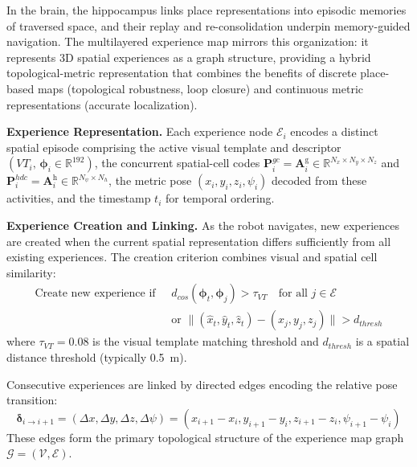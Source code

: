 In the brain, the hippocampus links place representations into episodic memories of traversed space, and their replay and re-consolidation underpin memory-guided navigation. The multilayered experience map mirrors this organization: it represents 3D spatial experiences as a graph structure, providing a hybrid topological-metric representation that combines the benefits of discrete place-based maps (topological robustness, loop closure) and continuous metric representations (accurate localization).

\textbf{Experience Representation.} Each experience node $\mathcal{E}_i$ encodes a distinct spatial episode comprising the active visual template and descriptor $(VT_i,\,\boldsymbol{\phi}_i\in\mathbb{R}^{192})$, the concurrent spatial-cell codes $\mathbf{P}^{gc}_i=\mathbf{A}^\mathrm{g}_i\in\mathbb{R}^{N_x\times N_y\times N_z}$ and $\mathbf{P}^{hdc}_i=\mathbf{A}^\mathrm{h}_i\in\mathbb{R}^{N_\psi\times N_h}$, the metric pose $(x_i, y_i, z_i, \psi_i)$ decoded from these activities, and the timestamp $t_i$ for temporal ordering.

\textbf{Experience Creation and Linking.} As the robot navigates, new experiences are created when the current spatial representation differs sufficiently from all existing experiences. The creation criterion combines visual and spatial cell similarity:
\begin{equation}
    \begin{aligned}
        \text{Create new experience if }\; & d_{cos}(\boldsymbol{\phi}_t, \boldsymbol{\phi}_j) > \tau_{VT} \quad \text{for all } j \in \mathcal{E} \\
                                           & \text{or } \lVert (\hat{x}_t, \hat{y}_t, \hat{z}_t) - (x_j, y_j, z_j) \rVert > d_{thresh}
    \end{aligned}
\end{equation}
where $\tau_{VT} = 0.08$ is the visual template matching threshold and $d_{thresh}$ is a spatial distance threshold (typically 0.5~m).

Consecutive experiences are linked by directed edges encoding the relative pose transition:
\begin{equation}
    \boldsymbol{\delta}_{i \to i+1} = (\Delta x, \Delta y, \Delta z, \Delta \psi) = (x_{i+1} - x_i, y_{i+1} - y_i, z_{i+1} - z_i, \psi_{i+1} - \psi_i)
    \label{eq:edge}
\end{equation}
These edges form the primary topological structure of the experience map graph $\mathcal{G} = (\mathcal{V}, \mathcal{E})$.


